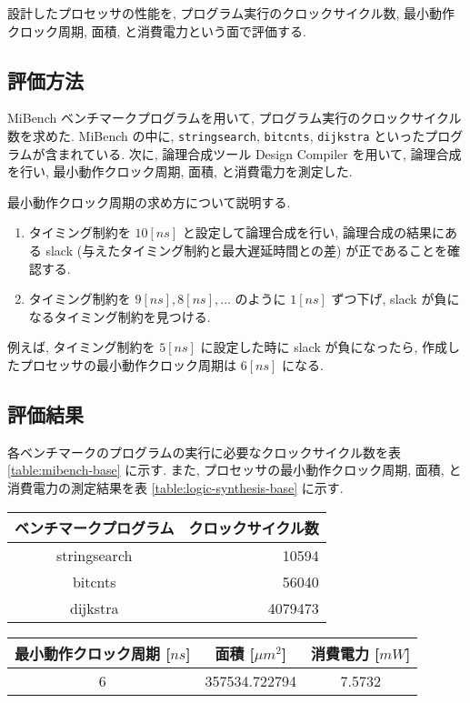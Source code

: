 \documentclass[../main.tex]{subfiles}
\begin{document}
  設計したプロセッサの性能を, プログラム実行のクロックサイクル数, 
  最小動作クロック周期, 面積, と消費電力という面で評価する.

  \subsection{評価方法}
  MiBench ベンチマークプログラムを用いて, プログラム実行のクロックサイクル数を求めた.
  MiBench の中に, \verb|stringsearch|, \verb|bitcnts|, \verb|dijkstra| といったプログラムが含まれている.
  次に, 論理合成ツール Design Compiler を用いて, 
  論理合成を行い, 最小動作クロック周期, 面積, と消費電力を測定した.

  最小動作クロック周期の求め方について説明する.
  \begin{enumerate}
    \item タイミング制約を $10[ns]$ と設定して論理合成を行い, 
    論理合成の結果にある slack (与えたタイミング制約と最大遅延時間との差) が正であることを確認する.
    \item タイミング制約を $9[ns], 8[ns], \dots$ のように $1[ns]$ ずつ下げ, 
    slack が負になるタイミング制約を見つける.
  \end{enumerate}

  例えば, タイミング制約を $5[ns]$ に設定した時に slack が負になったら, 
  作成したプロセッサの最小動作クロック周期は $6[ns]$ になる.

  \subsection{評価結果}
  各ベンチマークのプログラムの実行に必要なクロックサイクル数を表 \ref{table:mibench-base} に示す.
  また, プロセッサの最小動作クロック周期, 面積, と消費電力の測定結果を表 \ref{table:logic-synthesis-base} に示す.

  \begin{table*}[t]
    \centering
    \begin{tabular}{|c|r|}
    \hline
    ベンチマークプログラム  & クロックサイクル数 \\ \hline
    stringsearch & 10594     \\
    bitcnts      & 56040     \\
    dijkstra     & 4079473   \\ \hline
    \end{tabular}
    \caption{ベンチマークプログラムの実行クロックサイクル数}
    \label{table:mibench-base}
  \end{table*}

  \begin{table*}[t]
    \centering
    \begin{tabular}{|c|c|c|}
    \hline
    最小動作クロック周期 {[}$ns${]} & 面積 {[}$\mu m^2${]} & 消費電力 {[}$mW${]} \\ \hline
    6                   & 357534.722794    & 7.5732        \\ \hline
    \end{tabular}
    \caption{論理合成の結果}
    \label{table:logic-synthesis-base}
  \end{table*}
\end{document}
